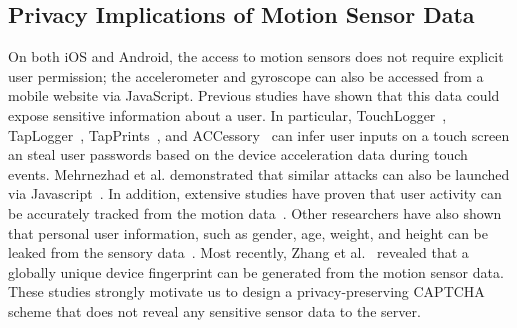 \subsection{Privacy Implications of Motion Sensor Data}

On both iOS and Android, the access to motion sensors does not require explicit user permission; the accelerometer and gyroscope can also be accessed from a mobile website via JavaScript. Previous studies have shown that this data could expose sensitive information about a user. In particular, TouchLogger~\cite{Cai:2011:TIK:2028040.2028049}, TapLogger~\cite{xu2012taplogger}, TapPrints~\cite{miluzzo2012tapprints}, and ACCessory~\cite{owusu2012accessory} can infer user inputs on a touch screen an steal user passwords based on the device acceleration data during touch events. Mehrnezhad et al. demonstrated that similar attacks can also be launched via Javascript~\cite{mehrnezhad2016touchsignatures}. In addition, extensive studies have proven that user activity can be accurately tracked from the motion data~\cite{REYESORTIZ2016754,SANSEGUNDO2018190}. Other researchers have also shown that personal user information, such as gender, age, weight, and height can be leaked from the sensory data~\cite{Malekzadeh:2018:PSD:3195258.3195260,davarci2017age}. Most recently, Zhang et al.~\cite{zhang2019sensorid} revealed that a globally unique device fingerprint can be generated from the motion sensor data. These studies strongly motivate us to design a privacy-preserving CAPTCHA scheme that does not reveal any sensitive sensor data to the server.
